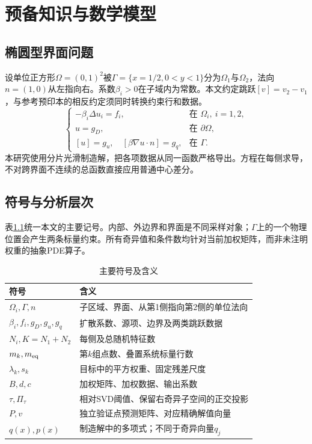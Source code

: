 \chapter{预备知识与数学模型}
\section{椭圆型界面问题}
设单位正方形$\Omega=(0,1)^2$被$\Gamma=\{x=1/2,0<y<1\}$分为$\Omega_1$与$\Omega_2$，法向$n=(1,0)$从左指向右。系数$\beta_i>0$在子域内为常数。本文约定跳跃$[v]=v_2-v_1$，与参考预印本的相反约定须同时转换约束行和数据。
\begin{equation}\label{eq:interface}
\begin{cases}
-\beta_i\Delta u_i=f_i,&\text{在 }\Omega_i,\ i=1,2,\\
u=g_D,&\text{在 }\partial\Omega,\\
[u]=g_u,\quad[\beta\nabla u\cdot n]=g_q,&\text{在 }\Gamma.
\end{cases}
\end{equation}
本研究使用分片光滑制造解，把各项数据从同一函数严格导出。方程在每侧求导，不对跨界面不连续的总函数直接应用普通中心差分。

\section{符号与分析层次}
表\ref{tab:symbols}统一本文的主要记号。内部、外边界和界面是不同采样对象；$\Gamma$上的一个物理位置会产生两条标量约束。所有奇异值和条件数均针对当前加权矩阵，而非未注明权重的抽象PDE算子。
\begin{table}[htbp]\centering\small
\caption{主要符号及含义}\label{tab:symbols}
\begin{tabular}{ll}\toprule
符号 & 含义\\\midrule
$\Omega_i,\Gamma,n$ & 子区域、界面、从第1侧指向第2侧的单位法向\\
$\beta_i,f_i,g_D,g_u,g_q$ & 扩散系数、源项、边界及两类跳跃数据\\
$N_i,K=N_1+N_2$ & 每侧及总随机特征数\\
$m_k,m_{\rm eq}$ & 第$k$组点数、叠置系统标量行数\\
$\lambda_k,s_k$ & 目标中的平方权重、固定残差尺度\\
$B,d,c$ & 加权矩阵、加权数据、输出系数\\
$\tau,\Pi_\tau$ & 相对SVD阈值、保留右奇异子空间的正交投影\\
$P,v$ & 独立验证点预测矩阵、对应精确解值向量\\
$q(x),p(x)$ & 制造解中的多项式；不同于奇异向量$q_j$\\
\bottomrule\end{tabular}\end{table}

